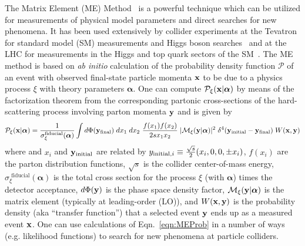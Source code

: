 The Matrix Element (ME) Method~\cite{Kondo:1988yd,Fiedler:2010sg,2011arXiv1101.2259V,Elahi:2017ppe} is a powerful technique which can be utilized for measurements of physical model parameters and direct searches for new phenomena.
It has been used extensively by collider experiments at the Tevatron for standard model (SM) measurements and Higgs boson searches~\cite{Abazov:2004cs,Abulencia:2006ry,Aaltonen:2008mv,Aaltonen:2010cm,Abazov:2009ii,Aaltonen:2009jj} and at the LHC for measurements in the Higgs and top quark sectors of the SM~\cite{Chatrchyan:2012xdj,Chatrchyan:2013mxa,Aad:2014eva,Khachatryan:2015tzo, Khachatryan:2015ila,Aad:2015gra,Aad:2015upn}.
The ME method is based on \emph{ab initio} calculation of the probability density function $\mathcal{P}$ of an event with observed final-state particle momenta ${\bf x}$ to be due to a physics process $\xi$ with theory parameters $\boldsymbol\alpha$.
One can compute $\mathcal{P}_{\xi}({\bf x}|{\boldsymbol\alpha})$ by means of the factorization theorem from the corresponding partonic cross-sections of the hard-scattering process involving parton momenta ${\bf y}$ and is given by
\begin{equation}
 \mathcal{P}_{\xi}({\bf x}|{\boldsymbol\alpha}) = \frac{1}{\sigma^{\rm fiducial}_{\xi}(\boldsymbol\alpha)} \int d\Phi ({\bf y}_{\rm final}) \; dx_1 \; dx_2~\frac{f(x_1)f(x_2)}{2s x_1 x_2} \; |\mathcal{M}_{\xi}({\bf y}|\boldsymbol\alpha)|^2 \; \delta^{4}({\bf y}_{\rm initial}-{\bf y}_{\rm final}) \; W({\bf x}, {\bf y})
 \label{eqn:MEProb}
\end{equation}
where and $x_i$ and ${\bf y}_{{\rm initial}}$ are related by $y_{{\rm initial},i}\equiv \frac{\sqrt{s}}{2}(x_i,0,0,\pm x_i)$, $f(x_i)$ are the parton distribution functions, $\sqrt{s}$ is the collider center-of-mass energy, $\sigma^{\textrm{ fiducial}}_{\xi}(\boldsymbol\alpha)$ is the total cross section for the process $\xi$ (with $\boldsymbol\alpha$) times the detector acceptance, $d\Phi({\bf y})$ is the phase space density factor, $\mathcal{M}_{\xi}({\bf y}|\boldsymbol\alpha)$ is the matrix element (typically at leading-order (LO)), and $W({\bf x}, {\bf y})$ is the probability density (aka ``transfer function'') that a selected event ${\bf y}$ ends up as a measured event ${\bf x}$.
One can use calculations of Eqn.~\ref{eqn:MEProb} in a number of ways (e.g. likelihood functions) to search for new phenomena at particle colliders.\\


